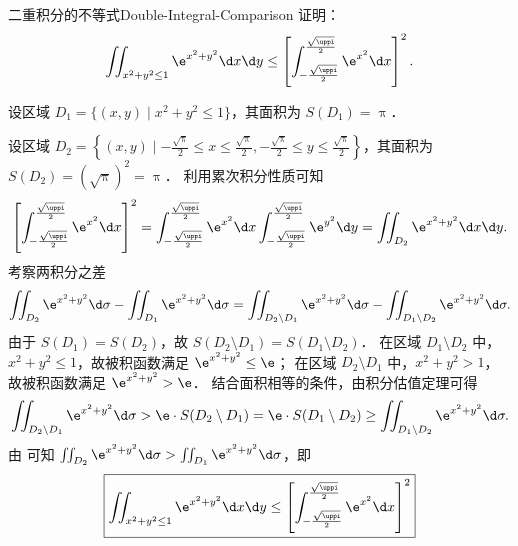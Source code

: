 \begin{problem}{二重积分的不等式}{Double-Integral-Comparison}
    证明：
    \begin{equation}
        \iint_{x^2+y^2 \le 1} \e^{x^2+y^2} \d x \d y \le \left[ \int_{-\frac{\sqrt{\uppi}}{2}}^{\frac{\sqrt{\uppi}}{2}} \e^{x^2} \d x \right]^2.
    \end{equation}
\end{problem}

\begin{myproof}

    设区域 $D_1 = \{ (x, y) \mid x^2 + y^2 \le 1 \}$，其面积为 $S(D_1) = \uppi$．

    设区域 $D_2 =  \left\{ (x, y)  \mid  -\frac{\sqrt{\uppi}}{2}  \le  x  \le  \frac{\sqrt{\uppi}}{2},  -\frac{\sqrt{\uppi}}{2}  \le  y  \le  \frac{\sqrt{\uppi}}{2}  \right\}$，其面积为 $S(D_2) = (\sqrt{\uppi})^2 = \uppi$．
    利用累次积分性质可知
    \begin{equation}
        \left[ \int_{-\frac{\sqrt{\uppi}}{2}}^{\frac{\sqrt{\uppi}}{2}} \e^{x^2} \d x \right]^2 = \int_{-\frac{\sqrt{\uppi}}{2}}^{\frac{\sqrt{\uppi}}{2}} \e^{x^2} \d x \int_{-\frac{\sqrt{\uppi}}{2}}^{\frac{\sqrt{\uppi}}{2}} \e^{y^2} \d y = \iint_{D_2} \e^{x^2+y^2} \d x \d y.
    \end{equation}
    考察两积分之差
    \begin{equation}
        \label{eq:diff-integral-01}
        \iint_{D_2} \e^{x^2+y^2} \d \sigma - \iint_{D_1} \e^{x^2+y^2} \d \sigma = \iint_{D_2 \setminus D_1} \e^{x^2+y^2} \d \sigma - \iint_{D_1 \setminus D_2} \e^{x^2+y^2} \d \sigma.
    \end{equation}
    由于 $S(D_1) = S(D_2)$，故 $S(D_2 \setminus D_1) = S(D_1 \setminus D_2)$．
    在区域 $D_1 \setminus D_2$ 中，$x^2 + y^2 \le 1$，故被积函数满足 $\e^{x^2+y^2} \le \e$；
    在区域 $D_2 \setminus D_1$ 中，$x^2 + y^2 > 1$，故被积函数满足 $\e^{x^2+y^2} > \e$．
    结合面积相等的条件，由积分估值定理可得
    \begin{equation}
        \iint_{D_2 \setminus D_1} \e^{x^2+y^2} \d \sigma > \e \cdot S(D_2 \setminus D_1) = \e \cdot S(D_1 \setminus D_2) \ge \iint_{D_1 \setminus D_2} \e^{x^2+y^2} \d \sigma.
    \end{equation}
    由  可知 $\iint_{D_2} \e^{x^2+y^2} \d \sigma > \iint_{D_1} \e^{x^2+y^2} \d \sigma$，即
    \begin{equation}
        \boxed{\iint_{x^2+y^2 \le 1} \e^{x^2+y^2} \d x \d y \le \left[ \int_{-\frac{\sqrt{\uppi}}{2}}^{\frac{\sqrt{\uppi}}{2}} \e^{x^2} \d x \right]^2}
    \end{equation}
\end{myproof}

